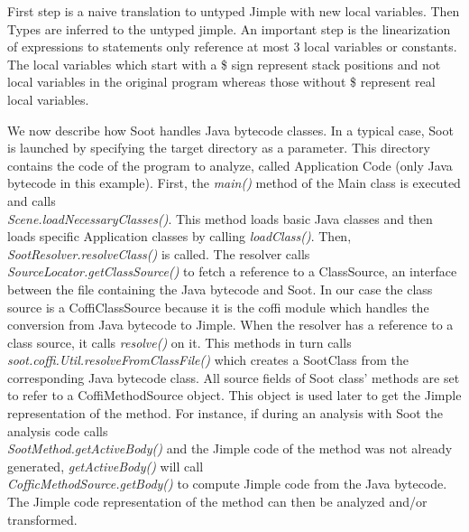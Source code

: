 \documentclass{dithesis}
\begin{document}
        First step is a naive translation to untyped Jimple with new local variables. Then Types are inferred to the untyped jimple. An important step is the linearization of expressions to statements only reference at most 3 local variables or constants. The local variables which start with a \$ sign represent stack positions and not local variables in the original program whereas those without \$ represent real local variables.
        
        We now describe how Soot handles Java bytecode classes. In a typical case, Soot is launched by specifying the target directory as a parameter. This directory contains the code of the program to analyze, called Application Code (only Java bytecode in this example). First, the \textit{main()} method of the Main class is executed and calls \\
        \textit{Scene.loadNecessaryClasses()}. This method loads basic Java classes and then loads specific Application classes by calling \textit{loadClass()}. Then, \textit{SootResolver.resolveClass()} is called. The resolver calls \\ 
        \textit{SourceLocator.getClassSource()} to fetch a reference to a ClassSource, an interface between the file containing the Java bytecode and Soot. In our case the class source is a CoffiClassSource because it is the coffi module which handles the conversion from Java bytecode to Jimple. When the resolver has a reference to a class source, it calls \textit{resolve()} on it. This methods in turn calls \\ \textit{soot.coffi.Util.resolveFromClassFile()} which creates a SootClass from the corresponding Java bytecode class. All source fields of Soot class’ methods are set to refer to a CoffiMethodSource object. This object is used later to get the Jimple representation of the method. For instance, if during an analysis with Soot the analysis code calls \\ \textit{SootMethod.getActiveBody()} and the Jimple code of the method was not already generated, \textit{getActiveBody()} will call \\ \textit{CofficMethodSource.getBody()} to compute Jimple code from the Java bytecode. The Jimple code representation of the method can then be analyzed and/or transformed.
\end{document}

